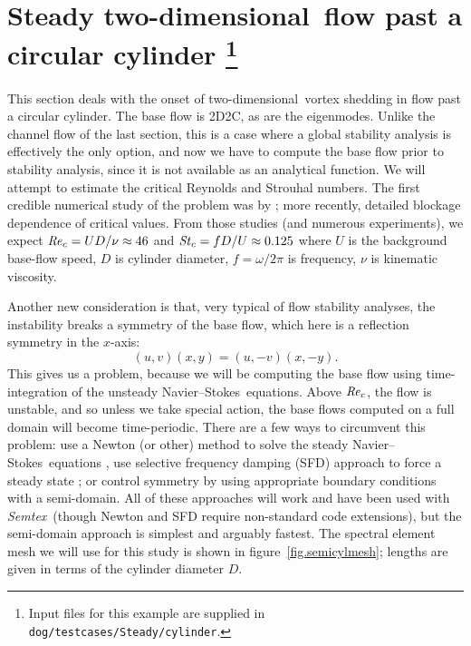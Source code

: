 \documentclass[11pt,a4paper]{report}
\newcommand\Rey{\mbox{\textit{Re}}}
\newcommand\Str{\mbox{\textit{St}}}
\newcommand\NavSto{Navier--Stokes}
\newcommand\twod{two-di\-men\-sion\-al}
\newcommand{\Semtex}{\emph{Semtex}}
\begin{document}
\section{Steady \twod\ flow past a circular cylinder
\protect\footnote{Input files for this example are supplied in
  \texttt{dog/testcases/Steady/cylinder}.}  }
\label{sec.cyl2d}

This section deals with the onset of \twod\ vortex shedding in flow
past a circular cylinder.  The base flow is 2D2C, as are the
eigenmodes.  Unlike the channel flow of the last section, this is a
case where a global stability analysis is effectively the only option,
and now we have to compute the base flow prior to stability analysis,
since it is not available as an analytical function.  We will attempt
to estimate the critical Reynolds and Strouhal numbers.  The first
credible numerical study of the problem was by \citet{jack87}; more
recently, \citet{kumi06} detailed blockage dependence of critical
values.  From those studies (and numerous experiments), we expect
$\Rey_c=UD/\nu\approx46$ and $\Str_c=fD/U\approx0.125$ where $U$ is
the background base-flow speed, $D$ is cylinder diameter,
$f=\omega/2\pi$ is frequency, $\nu$ is kinematic viscosity.

Another new consideration is that, very typical of flow stability
analyses, the instability breaks a symmetry of the base flow, which
here is a reflection symmetry in the $x$-axis:
\begin{equation}
(u,v)(x,y)=(u,-v)(x,-y).
\end{equation}
This gives us a problem, because we will be computing the base flow
using time-integration of the unsteady \NavSto\ equations.  Above
$\Rey_c$, the flow is unstable, and so unless we take special action,
the base flows computed on a full domain will become time-periodic.
There are a few ways to circumvent this problem: use a Newton (or
other) method to solve the steady \NavSto\ equations
\citep{tuba00,hmb02a}, use selective frequency damping (SFD) approach
to force a steady state \citep{abhhms06}; or control symmetry by using
appropriate boundary conditions with a semi-domain.  All of these
approaches will work and have been used with \Semtex\ (though Newton
and SFD require non-standard code extensions), but the semi-domain
approach is simplest and arguably fastest.  The spectral element
mesh we will use for this study is shown in
figure~\ref{fig.semicylmesh}; lengths are given in terms of the
cylinder diameter $D$.
\end{document}

